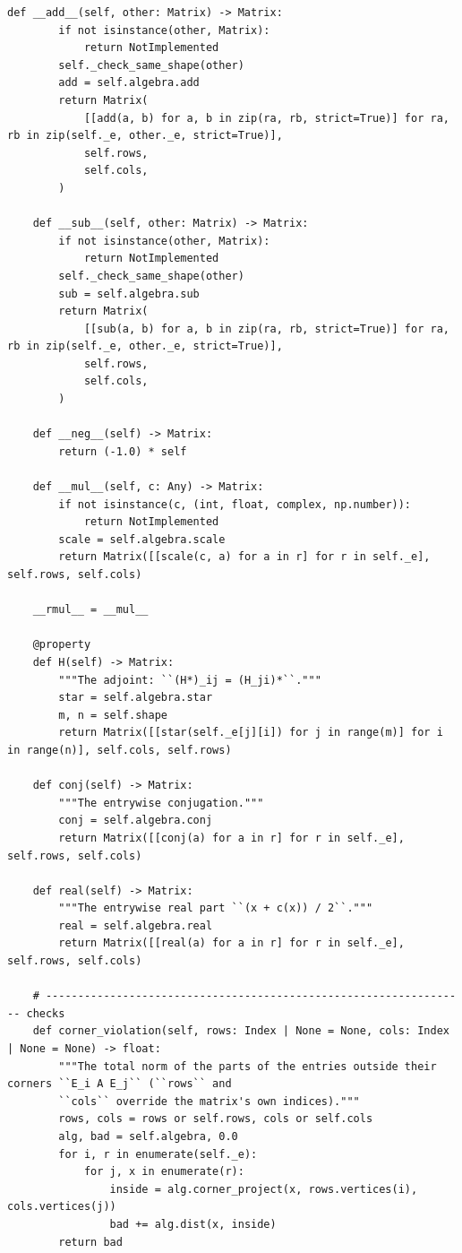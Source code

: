 \documentclass[12pt, a4paper]{report}
\theoremstyle{plain}
\theoremstyle{definition}
\theoremstyle{remark}
\theoremstyle{plain}
\begin{document}
\begin{lstlisting}[style=dsqcode]
    def __add__(self, other: Matrix) -> Matrix:
        if not isinstance(other, Matrix):
            return NotImplemented
        self._check_same_shape(other)
        add = self.algebra.add
        return Matrix(
            [[add(a, b) for a, b in zip(ra, rb, strict=True)] for ra, rb in zip(self._e, other._e, strict=True)],
            self.rows,
            self.cols,
        )

    def __sub__(self, other: Matrix) -> Matrix:
        if not isinstance(other, Matrix):
            return NotImplemented
        self._check_same_shape(other)
        sub = self.algebra.sub
        return Matrix(
            [[sub(a, b) for a, b in zip(ra, rb, strict=True)] for ra, rb in zip(self._e, other._e, strict=True)],
            self.rows,
            self.cols,
        )

    def __neg__(self) -> Matrix:
        return (-1.0) * self

    def __mul__(self, c: Any) -> Matrix:
        if not isinstance(c, (int, float, complex, np.number)):
            return NotImplemented
        scale = self.algebra.scale
        return Matrix([[scale(c, a) for a in r] for r in self._e], self.rows, self.cols)

    __rmul__ = __mul__

    @property
    def H(self) -> Matrix:
        """The adjoint: ``(H*)_ij = (H_ji)*``."""
        star = self.algebra.star
        m, n = self.shape
        return Matrix([[star(self._e[j][i]) for j in range(m)] for i in range(n)], self.cols, self.rows)

    def conj(self) -> Matrix:
        """The entrywise conjugation."""
        conj = self.algebra.conj
        return Matrix([[conj(a) for a in r] for r in self._e], self.rows, self.cols)

    def real(self) -> Matrix:
        """The entrywise real part ``(x + c(x)) / 2``."""
        real = self.algebra.real
        return Matrix([[real(a) for a in r] for r in self._e], self.rows, self.cols)

    # ------------------------------------------------------------------ checks
    def corner_violation(self, rows: Index | None = None, cols: Index | None = None) -> float:
        """The total norm of the parts of the entries outside their corners ``E_i A E_j`` (``rows`` and
        ``cols`` override the matrix's own indices)."""
        rows, cols = rows or self.rows, cols or self.cols
        alg, bad = self.algebra, 0.0
        for i, r in enumerate(self._e):
            for j, x in enumerate(r):
                inside = alg.corner_project(x, rows.vertices(i), cols.vertices(j))
                bad += alg.dist(x, inside)
        return bad


\end{lstlisting}
\end{document}
